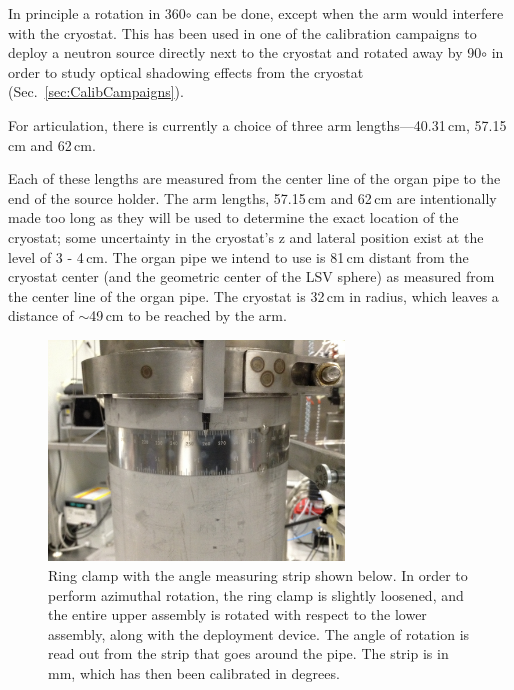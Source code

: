 In principle a rotation in 360$\circ$ can be done, except when the arm would interfere with the cryostat. This has been used in one of the calibration campaigns to deploy a neutron source directly next to the cryostat and rotated away by 90$\circ$ in order to study optical shadowing effects from the cryostat (Sec.~\ref{sec:CalibCampaigns}). 


For articulation, there is currently a choice of three arm lengths---40.31\,cm,  57.15\,cm and 62\,cm.  

Each of these lengths are measured from the center line of the organ pipe to the end of the source holder.  The arm lengths, 57.15\,cm and 62\,cm are intentionally made too long as they will be used to determine the exact location of the cryostat; some uncertainty in the cryostat's z and lateral position exist at the level of 3 - 4\,cm. The organ pipe we intend to use is 81\,cm distant from the cryostat center (and the geometric center of the LSV sphere) as measured from the center line of the organ pipe. The cryostat is 32\,cm in radius, which leaves a distance of $\sim$49\,cm to be reached  by the arm.


\begin{figure}[htbp]
 \centering
  \includegraphics[width=0.7\textwidth]{Figures/RingClamp_WithPin_IMG_2669.JPG}
  \caption{Ring clamp  with the angle measuring strip shown below. In order to perform azimuthal rotation, the ring clamp is slightly loosened, and the entire upper assembly is rotated with respect to the lower assembly, along with the deployment device. The angle of rotation is read out from the strip that goes around the pipe. The strip is in mm, which has then been calibrated in degrees.}
  \label{fig:ring_clamp}
\end{figure} 

